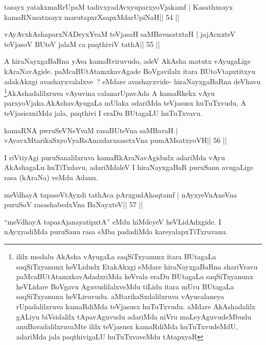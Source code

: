 \begin{shl}
tasayx yatakxmaRrUpaM tadivxyadAvxyuparxyoVjakamf |
Kasathxsayx kamaRNasatxsayx marutapxrXsapxMdarUpiNaH\hfill || 54 ||
\end{shl}

\begin{shl}
vAyAvxkAshaparxNADeyxYvaM teVjasaH saMBavasatxtaH |
jajAcnxteV teVjasoV BUteV jalaM ca paqthiviV tathA\hfill || 55 ||
\end{shl}

\begin{artha}
A hiraNayxgaBaRna yAva kamaRviruvudo, adeV AkAsha matutx vAyugaLige
kAraNavAgide. paMcaBUtAtamxkavAgade BoVgavilalx itara BUtoVtapxtitxyu
adakAkxgi avashayxvalalxve~? eMdare avashayxvide- hiraNayxgaBaRna
deVhavu \footnote{ililx modalu AkAsha vAyugaLa saqSiTxyanunx itara
BUtagaLa saqSiTxyanunx heVLidudx EtakAkxgi eMdare hiraNayxgaBaRna
shariVravu paMcaBUtAtamxkavAdadxriMda keVvala eraDu BUtagaLa
saqSiTxyanunx heVLidare BoVgavu AguvudilalxveMdu tiLidu itara mUru
BUtagaLa saqSiTxyanunx heVLiruvudu. aMtarikaSxdalilxruva
vAyucalaneya rUpadalilxruva kamaRdiMda teVjasusx huTuTxvudu. aMdare
AkAshadalilx gALiyu biVsidalilx tApavAguvudu adariMda niVru
maLeyAguvudeMbudu anuBavadalilxruvaMte ililx teVjasusx kamaRdiMda
huTuTxvudeMdU, adariMda jala paqthivigaLU huTuTxvaveMdu tAtapxyaR}AkAshadalilx\-ruva vAyuvina calanarUpavAda A
kamaRkekx vAyu parxyoVjaka.\break AkAshavAyugaLa mUlaka adariMda teVjasusx huTuTxvudu, A
teVjasisxniMda jala, paqthivi I eraDu BUtagaLU huTuTxvavu.
\end{artha}

\begin{shl}
kamaRNA pwruSeVNeYvaM rasaBUteVna saMBavaH |
vAyavxMtarikaSxyoVyaRsAmxdarxsasetxVna pumAMsatxyoVH\hfill || 56 ||
\end{shl}

\begin{artha}
I riVtiyAgi puruSanalilxruva kamaRkAraNavAgidudx adariMda vAyu AkAshagaLu huTiTxdavu, adariMdaleV I hiraNayxgaBaR puruSanu avugaLige rasa (kAraNa) veMdu Adanu.
\end{artha}

\begin{shl}
meVdhayA tapaseVtAyxdi tathAca pArxgudAhaqtamf |
nAyxyeVnAneVna puruSoV rasashabedxVna BaNayxteV\hfill || 57 ||
\end{shl}

\begin{artha}
``meVdhayA tapasA\s janayatipxtA'' eMdu hiMdeyeV heVLidAdxgide. I nAyxyadiMda puruSanu rasa eMba padadiMda kareyalapxTiTxruvanu.
\end{artha}

